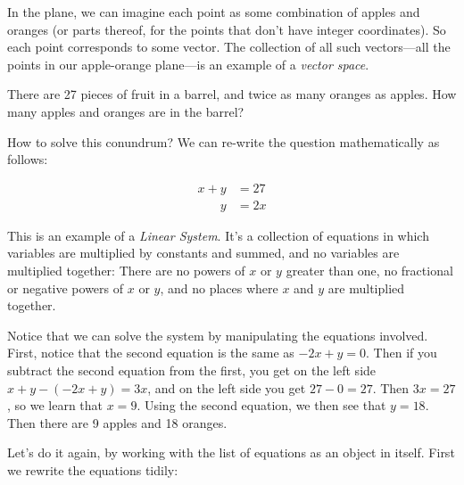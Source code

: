 \vspace{2mm}
\begin{center}
\end{center}
In the plane, we can imagine each point as some combination of apples and oranges (or parts thereof, for the points that don't have integer coordinates).  So each point corresponds to some vector.  The collection of all such vectors---all the points in our apple-orange plane---is an example of a \emph{vector space}.

\begin{example}  There are 27 pieces of fruit in a barrel, and twice as many oranges as apples.  How many apples and oranges are in the barrel?

How to solve this conundrum?  We can re-write the question mathematically as follows:

\begin{align*}
	x+y & = 27 \\
	\phantom{x+}y & = 2x
\end{align*}
\end{example}

This is an example of a \emph{Linear System}.  It's a collection of equations in which variables are multiplied by constants and summed, and no variables are multiplied together:  There are no powers of $x$ or $y$ greater than one, no fractional or negative powers of $x$ or $y$, and no places where $x$ and $y$ are multiplied together.

Notice that we can solve the system by manipulating the equations involved.  First, notice that the second equation is the same as $-2x+y=0$.  Then if you subtract the second equation from the first, you get on the left side $x+y - (-2x+y) = 3x$, and on the left side you get $27-0=27$.  Then $3x=27$, so we learn that $x=9$.  Using the second equation, we then see that $y=18$.  Then there are 9 apples and 18 oranges.

Let's do it again, by working with the list of equations as an object in itself.  First we rewrite the equations tidily:

